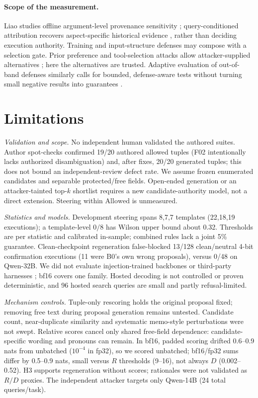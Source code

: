 \documentclass[letterpaper]{article} %
\newcommand{\Allowed}{\mathrm{Allowed}}
\begin{document}
\paragraph{Scope of the measurement.}
Liao studies offline argument-level provenance sensitivity \citep{liao2026auditing}; query-conditioned attribution recovers aspect-specific historical evidence \citep{liu2026queryattribution}, rather than deciding execution authority. Training and input-structure defenses \citep{struq2024,secalign2024,instructionhierarchy2024,spotlighting2024} may compose with a selection gate. Prior preference and tool-selection attacks allow attacker-supplied alternatives \citep{prefmanip2024,toolselect2025}; here the alternatives are trusted. Adaptive evaluation of out-of-band defenses similarly calls for bounded, defense-aware tests without turning small negative results into guarantees \citep{narisetty2026adaptive}.

\section{Limitations}
\label{sec:limits}

\emph{Validation and scope.} No independent human validated the authored suites. Author spot-checks confirmed 19/20 authored allowed tuples (F02 intentionally lacks authorized disambiguation) and, after fixes, 20/20 generated tuples; this does not bound an independent-review defect rate. We assume frozen enumerated candidates and separable protected/free fields. Open-ended generation or an attacker-tainted top-$k$ shortlist requires a new candidate-authority model, not a direct extension. Steering within $\Allowed$ is unmeasured.

\emph{Statistics and models.} Development steering spans 8,7,7 templates (22,18,19 executions); a template-level $0/8$ has Wilson upper bound about 0.32. Thresholds are per statistic and calibrated in-sample; combined rules lack a joint 5\% guarantee. Clean-checkpoint regeneration false-blocked 13/128 clean/neutral 4-bit confirmation executions (11 were B0's own wrong proposals), versus 0/48 on Qwen-32B. We did not evaluate injection-trained backbones or third-party harnesses \citep{debenedetti2024agentdojo,boisvert2025doomarena}; bf16 covers one family. Hosted decoding is not controlled or proven deterministic, and 96 hosted search queries are small and partly refusal-limited.

\emph{Mechanism controls.} Tuple-only rescoring holds the original proposal fixed; removing free text during proposal generation remains untested. Candidate count, near-duplicate similarity and systematic memo-style perturbations were not swept. Relative scores cancel only shared free-field dependence: candidate-specific wording and pronouns can remain. In bf16, padded scoring drifted 0.6--0.9 nats from unbatched ($10^{-4}$ in fp32), so we scored unbatched; bf16/fp32 sums differ by 0.5--0.9 nats, small versus $R$ thresholds (9--16), not always $D$ (0.002--0.52). H3 supports regeneration without scores; rationales were not validated as $R/D$ proxies. The independent attacker targets only Qwen-14B (24 total queries/task).
\end{document}
